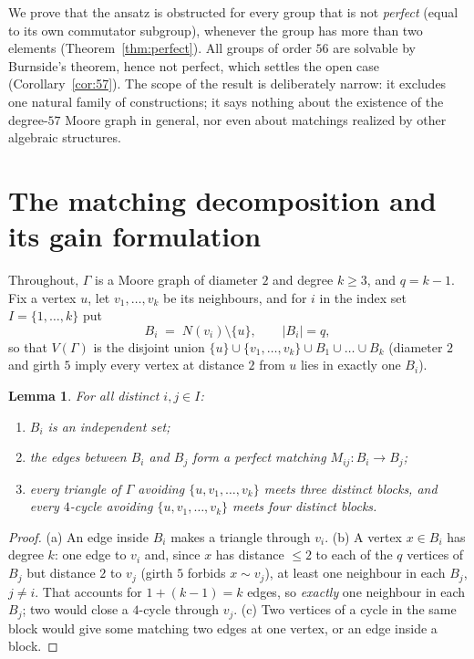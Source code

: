 \documentclass[10pt]{article}
\newtheorem{lemma}[theorem]{Lemma}
\begin{document}
We prove that the ansatz is obstructed for every group that is not
\emph{perfect} (equal to its own commutator subgroup), whenever the
group has more than two elements
(Theorem~\ref{thm:perfect}). All groups of order $56$ are solvable by
Burnside's theorem, hence not perfect, which settles the open case
(Corollary~\ref{cor:57}). The scope of the result is deliberately
narrow: it excludes one natural family of constructions; it says nothing
about the existence of the degree-$57$ Moore graph in general, nor even
about matchings realized by other algebraic structures.

\section{The matching decomposition and its gain formulation}
\label{sec:gain}

Throughout, $\Gamma$ is a Moore graph of diameter $2$ and degree
$k\ge 3$, and $q=k-1$. Fix a vertex $u$, let $v_1,\dots,v_k$ be its
neighbours, and for $i$ in the index set $I=\{1,\dots,k\}$ put
\[
B_i \;=\; N(v_i)\setminus\{u\},
\qquad |B_i| = q,
\]
so that $V(\Gamma)$ is the disjoint union
$\{u\}\cup\{v_1,\dots,v_k\}\cup B_1\cup\dots\cup B_k$
(diameter $2$ and girth $5$ imply every vertex at distance $2$ from $u$
lies in exactly one $B_i$).

\begin{lemma}\label{lem:blocks}
For all distinct $i,j\in I$:
\begin{enumerate}
\item[(a)] $B_i$ is an independent set;
\item[(b)] the edges between $B_i$ and $B_j$ form a perfect matching
$M_{ij}\colon B_i\to B_j$;
\item[(c)] every triangle of $\Gamma$ avoiding
$\{u,v_1,\dots,v_k\}$ meets three distinct blocks, and every
$4$-cycle avoiding $\{u,v_1,\dots,v_k\}$ meets four distinct blocks.
\end{enumerate}
\end{lemma}

\begin{proof}
(a) An edge inside $B_i$ makes a triangle through $v_i$.
(b) A vertex $x\in B_i$ has degree $k$: one edge to $v_i$ and, since
$x$ has distance $\le 2$ to each of the $q$ vertices of $B_j$ but
distance $2$ to $v_j$ (girth $5$ forbids $x\sim v_j$), at least one
neighbour in each $B_j$, $j\ne i$. That accounts for $1+(k-1)=k$ edges,
so \emph{exactly} one neighbour in each $B_j$; two would close a
$4$-cycle through $v_j$.
(c) Two vertices of a cycle in the same block would give some matching
two edges at one vertex, or an edge inside a block.
\end{proof}
\end{document}
